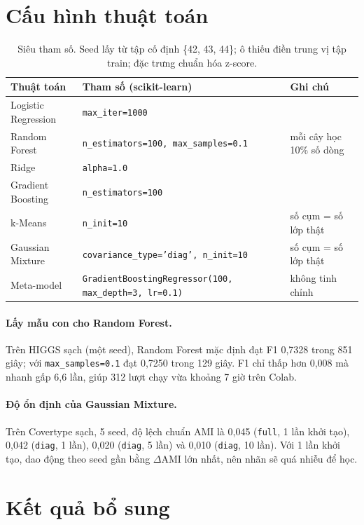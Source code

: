\section{Cấu hình thuật toán}
\label{app:cau-hinh}

\begin{table}[ht]
\centering
\small
\begin{tabular}{@{}lll@{}}
\toprule
Thuật toán & Tham số (scikit-learn) & Ghi chú \\
\midrule
Logistic Regression & \texttt{max\_iter=1000} & \\
Random Forest & \texttt{n\_estimators=100, max\_samples=0.1} & mỗi cây học 10\% số dòng \\
Ridge & \texttt{alpha=1.0} & \\
Gradient Boosting & \texttt{n\_estimators=100} & \\
k-Means & \texttt{n\_init=10} & số cụm = số lớp thật \\
Gaussian Mixture & \texttt{covariance\_type='diag', n\_init=10} & số cụm = số lớp thật \\
Meta-model & \texttt{GradientBoostingRegressor(100, max\_depth=3, lr=0.1)} & không tinh chỉnh \\
\bottomrule
\end{tabular}
\caption{Siêu tham số. Seed lấy từ tập cố định \{42, 43, 44\}; ô thiếu điền trung vị tập train; đặc trưng chuẩn hóa z-score.}
\end{table}

\paragraph{Lấy mẫu con cho Random Forest.} Trên HIGGS sạch (một seed), Random Forest mặc định đạt F1 0,7328 trong 851 giây; với \texttt{max\_samples=0.1} đạt 0,7250 trong 129 giây. F1 chỉ thấp hơn 0,008 mà nhanh gấp 6,6 lần, giúp 312 lượt chạy vừa khoảng 7 giờ trên Colab.

\paragraph{Độ ổn định của Gaussian Mixture.} Trên Covertype sạch, 5 seed, độ lệch chuẩn AMI là 0,045 (\texttt{full}, 1 lần khởi tạo), 0,042 (\texttt{diag}, 1 lần), 0,020 (\texttt{diag}, 5 lần) và 0,010 (\texttt{diag}, 10 lần). Với 1 lần khởi tạo, dao động theo seed gần bằng $\Delta$AMI lớn nhất, nên nhãn sẽ quá nhiễu để học.

\section{Kết quả bổ sung}
\label{app:phu}

